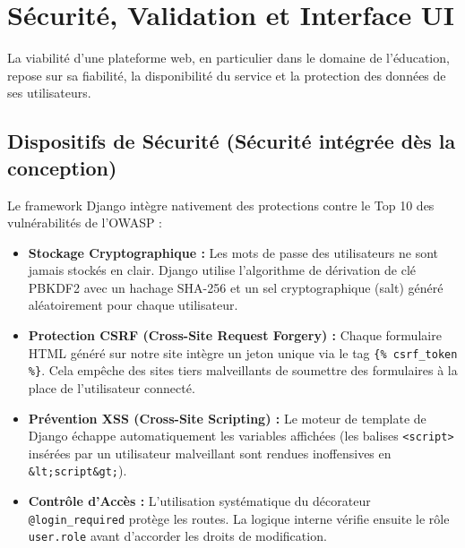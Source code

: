 \documentclass[12pt,a4paper]{report}
\begin{document}
\chapter{Sécurité, Validation et Interface UI}

La viabilité d'une plateforme web, en particulier dans le domaine de l'éducation, repose sur sa fiabilité, la disponibilité du service et la protection des données de ses utilisateurs.

\section{Dispositifs de Sécurité (Sécurité intégrée dès la conception)}
Le framework Django intègre nativement des protections contre le Top 10 des vulnérabilités de l'OWASP :
\begin{itemize}
    \item \textbf{Stockage Cryptographique :} Les mots de passe des utilisateurs ne sont jamais stockés en clair. Django utilise l'algorithme de dérivation de clé PBKDF2 avec un hachage SHA-256 et un sel cryptographique (salt) généré aléatoirement pour chaque utilisateur.
    \item \textbf{Protection CSRF (Cross-Site Request Forgery) :} Chaque formulaire HTML généré sur notre site intègre un jeton unique via le tag \texttt{\{\% csrf\_token \%\}}. Cela empêche des sites tiers malveillants de soumettre des formulaires à la place de l'utilisateur connecté.
    \item \textbf{Prévention XSS (Cross-Site Scripting) :} Le moteur de template de Django échappe automatiquement les variables affichées (les balises \texttt{<script>} insérées par un utilisateur malveillant sont rendues inoffensives en \texttt{\&lt;script\&gt;}).
    \item \textbf{Contrôle d'Accès :} L'utilisation systématique du décorateur \texttt{@login\_required} protège les routes. La logique interne vérifie ensuite le rôle \texttt{user.role} avant d'accorder les droits de modification.
\end{itemize}
\end{document}
